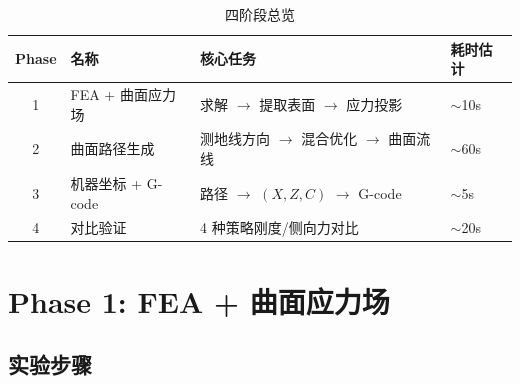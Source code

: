 \documentclass[11pt,a4paper]{article}
\begin{document}
\begin{table}[H]
\centering
\begin{tabularx}{\textwidth}{c l X l}
\toprule
\textbf{Phase} & \textbf{名称} & \textbf{核心任务} & \textbf{耗时估计} \\
\midrule
1 & FEA + 曲面应力场 & 求解 $\to$ 提取表面 $\to$ 应力投影 & $\sim$10s \\
2 & 曲面路径生成 & 测地线方向 $\to$ 混合优化 $\to$ 曲面流线 & $\sim$60s \\
3 & 机器坐标 + G-code & 路径 $\to$ $(X,Z,C)$ $\to$ G-code & $\sim$5s \\
4 & 对比验证 & 4 种策略刚度/侧向力对比 & $\sim$20s \\
\bottomrule
\end{tabularx}
\caption{四阶段总览}
\end{table}


\newpage
\section{Phase 1: FEA + 曲面应力场}

\subsection{实验步骤}
\end{document}
